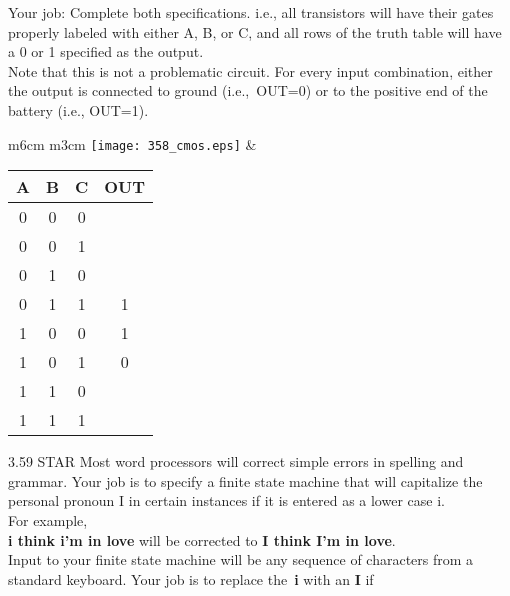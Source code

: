 \documentclass{patt}
\begin{document}
\begin{exercises}
\vspace{0.2in}
\noindent
Your job: Complete both specifications.  i.e., all transistors will have their
gates properly labeled with either A, B, or C, and all rows of the truth table
will have a 0 or 1 specified as the output.
\\

\vspace{0.2in}
\noindent
Note that this is not a problematic circuit.  For every input combination,
either the output is connected to ground (i.e.,~OUT=0) or to the positive end
of the battery (i.e., OUT=1).
\\

\vspace{0.3in}
\begin{tabular}{m{6cm} m{3cm}}
\texttt{[image: 358\_cmos.eps]}
&
\begin{tabular}{|c|c|c||c|}
\hline
A & B & C & OUT \\ \hline \hline
0 & 0 & 0 & \\ \hline
0 & 0 & 1 & \\ \hline
0 & 1 & 0 & \\ \hline
0 & 1 & 1 & 1 \\ \hline
1 & 0 & 0 & 1 \\ \hline
1 & 0 & 1 & 0 \\ \hline
1 & 1 & 0 & \\ \hline
1 & 1 & 1 & \\ \hline
\end{tabular}
\end{tabular}

\newpage

\item[3.59]STAR Most word processors will correct simple errors in spelling and grammar.  Your job is to specify a finite state machine that will capitalize the personal pronoun I in certain instances if it is entered as a lower case i.
\\

\noindent
\vspace{0.2in}
For example, 
\noindent 
\\ {\bf i think i'm in love} will be corrected to {\bf I think I'm in
love}.
\\
\vspace{0.2in}
\noindent
Input to your finite state machine will be any sequence of characters from a
standard keyboard.  Your job is to replace the~{\bf i} with an {\bf I} if
\\


\end{exercises}
\end{document}
